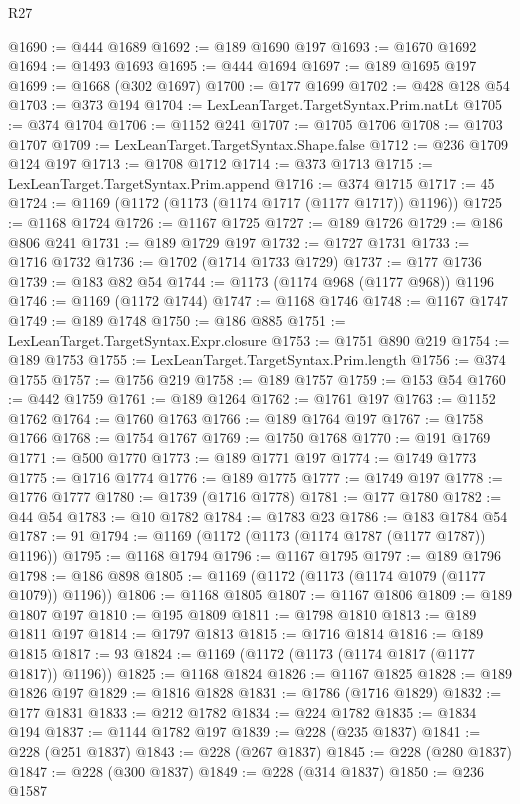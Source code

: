\begin{lexlean}{R27}
\begin{coremodule}
@1690 := @444 @1689
@1692 := @189 @1690 @197
@1693 := @1670 @1692
@1694 := @1493 @1693
@1695 := @444 @1694
@1697 := @189 @1695 @197
@1699 := @1668 (@302 @1697)
@1700 := @177 @1699
@1702 := @428 @128 @54
@1703 := @373 @194
@1704 := LexLeanTarget.TargetSyntax.Prim.natLt
@1705 := @374 @1704
@1706 := @1152 @241
@1707 := @1705 @1706
@1708 := @1703 @1707
@1709 := LexLeanTarget.TargetSyntax.Shape.false
@1712 := @236 @1709 @124 @197
@1713 := @1708 @1712
@1714 := @373 @1713
@1715 := LexLeanTarget.TargetSyntax.Prim.append
@1716 := @374 @1715
@1717 := 45
@1724 := @1169 (@1172 (@1173 (@1174 @1717 (@1177 @1717)) @1196))
@1725 := @1168 @1724
@1726 := @1167 @1725
@1727 := @189 @1726
@1729 := @186 @806 @241
@1731 := @189 @1729 @197
@1732 := @1727 @1731
@1733 := @1716 @1732
@1736 := @1702 (@1714 @1733 @1729)
@1737 := @177 @1736
@1739 := @183 @82 @54
@1744 := @1173 (@1174 @968 (@1177 @968)) @1196
@1746 := @1169 (@1172 @1744)
@1747 := @1168 @1746
@1748 := @1167 @1747
@1749 := @189 @1748
@1750 := @186 @885
@1751 := LexLeanTarget.TargetSyntax.Expr.closure
@1753 := @1751 @890 @219
@1754 := @189 @1753
@1755 := LexLeanTarget.TargetSyntax.Prim.length
@1756 := @374 @1755
@1757 := @1756 @219
@1758 := @189 @1757
@1759 := @153 @54
@1760 := @442 @1759
@1761 := @189 @1264
@1762 := @1761 @197
@1763 := @1152 @1762
@1764 := @1760 @1763
@1766 := @189 @1764 @197
@1767 := @1758 @1766
@1768 := @1754 @1767
@1769 := @1750 @1768
@1770 := @191 @1769
@1771 := @500 @1770
@1773 := @189 @1771 @197
@1774 := @1749 @1773
@1775 := @1716 @1774
@1776 := @189 @1775
@1777 := @1749 @197
@1778 := @1776 @1777
@1780 := @1739 (@1716 @1778)
@1781 := @177 @1780
@1782 := @44 @54
@1783 := @10 @1782
@1784 := @1783 @23
@1786 := @183 @1784 @54
@1787 := 91
@1794 := @1169 (@1172 (@1173 (@1174 @1787 (@1177 @1787)) @1196))
@1795 := @1168 @1794
@1796 := @1167 @1795
@1797 := @189 @1796
@1798 := @186 @898
@1805 := @1169 (@1172 (@1173 (@1174 @1079 (@1177 @1079)) @1196))
@1806 := @1168 @1805
@1807 := @1167 @1806
@1809 := @189 @1807 @197
@1810 := @195 @1809
@1811 := @1798 @1810
@1813 := @189 @1811 @197
@1814 := @1797 @1813
@1815 := @1716 @1814
@1816 := @189 @1815
@1817 := 93
@1824 := @1169 (@1172 (@1173 (@1174 @1817 (@1177 @1817)) @1196))
@1825 := @1168 @1824
@1826 := @1167 @1825
@1828 := @189 @1826 @197
@1829 := @1816 @1828
@1831 := @1786 (@1716 @1829)
@1832 := @177 @1831
@1833 := @212 @1782
@1834 := @224 @1782
@1835 := @1834 @194
@1837 := @1144 @1782 @197
@1839 := @228 (@235 @1837)
@1841 := @228 (@251 @1837)
@1843 := @228 (@267 @1837)
@1845 := @228 (@280 @1837)
@1847 := @228 (@300 @1837)
@1849 := @228 (@314 @1837)
@1850 := @236 @1587

\end{coremodule}
\end{lexlean}
